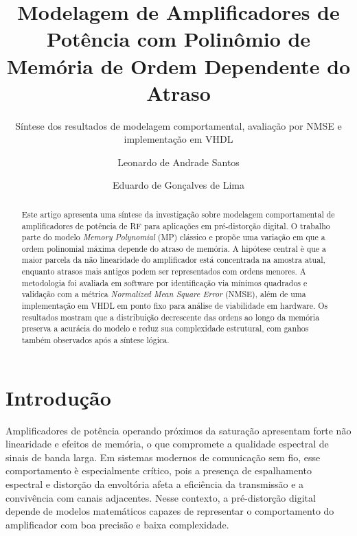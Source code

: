 \documentclass[sigconf]{acmart}
\begin{document}
\title{Modelagem de Amplificadores de Pot\^encia com Polin\^omio de Mem\'oria de Ordem Dependente do Atraso}
\subtitle{S\'intese dos resultados de modelagem comportamental, avalia\c{c}\~ao por NMSE e implementa\c{c}\~ao em VHDL}

\author{Leonardo de Andrade Santos}

\author{Eduardo de Gon\c{c}alves de Lima}

\renewcommand{\shortauthors}{Santos and Lima}

\begin{abstract}
Este artigo apresenta uma s\'intese da investiga\c{c}\~ao sobre modelagem comportamental de amplificadores de pot\^encia de RF para aplica\c{c}\~oes em pr\'e-distor\c{c}\~ao digital. O trabalho parte do modelo \textit{Memory Polynomial} (MP) cl\'assico e prop\~oe uma varia\c{c}\~ao em que a ordem polinomial m\'axima depende do atraso de mem\'oria. A hip\'otese central \`e que a maior parcela da n\~ao linearidade do amplificador est\'a concentrada na amostra atual, enquanto atrasos mais antigos podem ser representados com ordens menores. A metodologia foi avaliada em software por identifica\c{c}\~ao via m\'inimos quadrados e valida\c{c}\~ao com a m\'etrica \textit{Normalized Mean Square Error} (NMSE), al\'em de uma implementa\c{c}\~ao em VHDL em ponto fixo para an\'alise de viabilidade em hardware. Os resultados mostram que a distribui\c{c}\~ao decrescente das ordens ao longo da mem\'oria preserva a acur\'acia do modelo e reduz sua complexidade estrutural, com ganhos tamb\'em observados ap\'os a s\'intese l\'ogica.
\end{abstract}


\maketitle

\section{Introdu\c{c}\~ao}
Amplificadores de pot\^encia operando pr\'oximos da satura\c{c}\~ao apresentam forte n\~ao linearidade e efeitos de mem\'oria, o que compromete a qualidade espectral de sinais de banda larga. Em sistemas modernos de comunica\c{c}\~ao sem fio, esse comportamento \`e especialmente cr\'itico, pois a presen\c{c}a de espalhamento espectral e distor\c{c}\~ao da envolt\'oria afeta a efici\^encia da transmiss\~ao e a conviv\^encia com canais adjacentes. Nesse contexto, a pr\'e-distor\c{c}\~ao digital depende de modelos matem\'aticos capazes de representar o comportamento do amplificador com boa precis\~ao e baixa complexidade.
\end{document}
